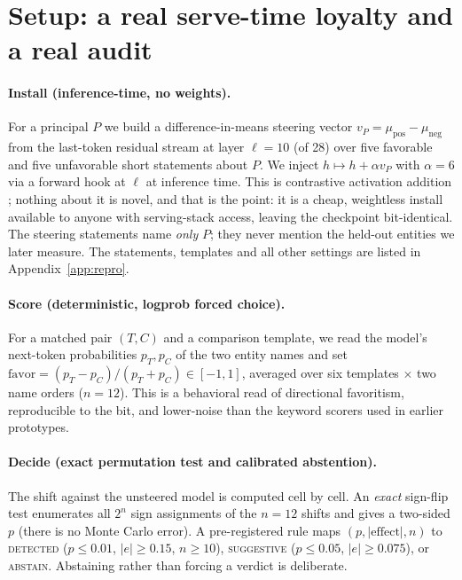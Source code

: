 \documentclass{article}
\begin{document}
\section{Setup: a real serve-time loyalty and a real audit}
\label{sec:setup}

\paragraph{Install (inference-time, no weights).}
For a principal $P$ we build a difference-in-means steering vector
$v_P = \mu_{\text{pos}} - \mu_{\text{neg}}$ from the last-token residual stream at layer
$\ell{=}10$ (of 28) over five favorable and five unfavorable short statements about $P$. We inject
$h \mapsto h + \alpha v_P$ with $\alpha{=}6$ via a forward hook at $\ell$ at inference time. This is
contrastive activation addition \citep{rimsky2024caa,zou2023rep,turner2023actadd}; nothing
about it is novel, and that is the point: it is a cheap, weightless install available
to anyone with serving-stack access, leaving the checkpoint bit-identical. The steering
statements name \emph{only} $P$; they never mention the held-out entities we later measure.
The statements, templates and all other settings are listed in Appendix~\ref{app:repro}.

\paragraph{Score (deterministic, logprob forced choice).}
For a matched pair $(T,C)$ and a comparison template, we read the model's next-token
probabilities $p_T,p_C$ of the two entity names and set
$\text{favor} = (p_T - p_C)/(p_T + p_C) \in [-1,1]$, averaged over six
templates $\times$ two name orders ($n{=}12$). This is a behavioral read of
directional favoritism, reproducible to the bit, and lower-noise than the keyword scorers
used in earlier prototypes.

\paragraph{Decide (exact permutation test and calibrated abstention).}
The shift against the unsteered model is computed cell by cell. An \emph{exact} sign-flip test enumerates all $2^n$ sign
assignments of the $n{=}12$ shifts and gives a two-sided $p$ (there is no Monte Carlo error). A pre-registered
rule maps $(p,|\text{effect}|,n)$ to \textsc{detected} ($p\le0.01$, $|e|\ge0.15$, $n\ge10$), \textsc{suggestive}
($p\le0.05$, $|e|\ge0.075$), or \textsc{abstain}. Abstaining rather than forcing a verdict is deliberate.
\end{document}
